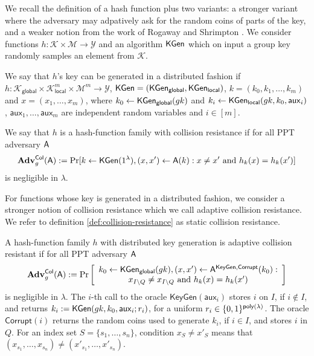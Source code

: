 
We recall the definition of a hash function plus two variants: a stronger variant where  the adversary may adpatively ask for the random coins of parts of the key, and a weaker notion from the work of Rogaway and Shrimpton \cite{FSE:RogShr04}. We consider functions $h:\mathcal{K}\times\mathcal{M}\to\mathcal{Y}$ and an algorithm $\mathsf{KGen}$ which on input a group key randomly samples an element from $\mathcal{K}$.

We say that $h$'s key can be generated in a distributed fashion if $h:\mathcal{K}_\mathsf{global}\times\mathcal{K}^m_{\mathsf{local}}\times\mathcal{M}^m\to \mathcal{Y}$, $\mathsf{KGen} = (\mathsf{KGen}_\mathsf{global},\mathsf{KGen}_\mathsf{local})$, $k = (k_0,k_1,\ldots,k_m)$ and $x=(x_1,\ldots,x_m)$, where $k_0\gets\mathsf{KGen}_{\mathsf{global}}(gk)$ and $k_i\gets\mathsf{KGen}_{\mathsf{local}}(gk,k_0,\mathsf{aux}_i)$, $\mathsf{aux}_1,\ldots,\mathsf{aux}_m$ are independent random variables and $i\in[m]$. 

\begin{definition}\label{def:hash1}
 We say that $h$ is a hash-function family with collision resistance if for all PPT adversary $\mathsf{A}$
$$
\mathbf{Adv}_g^{\mathsf{Col}}(\mathsf{A}) := \Pr[k\gets\mathsf{KGen}(1^\lambda), (x,x')\gets \mathsf{A}(k):x\neq x'\text{ and }h_k(x)=h_k(x')]
$$ 
is negligible in $\lambda$.
\label{def:collision-resistance}
\end{definition}

For functions whose key is generated in a distributed fashion, we consider a stronger notion of collision resistance which we call adaptive collision resistance. We refer to definition \ref{def:collision-resistance} as static collision resistance.


\begin{definition} \label{def:hash1-adaptive}
A hash-function family $h$ with distributed key generation is adaptive collision resistant if for all PPT adversary $\mathsf{A}$
$$
\mathbf{Adv}_g^{\mathsf{Col}}(\mathsf{A}) := \Pr\left[\begin{array}{c}
k_0\gets\mathsf{KGen}_{\mathsf{global}}(gk), (x,x')\gets \mathsf{A}^{\mathsf{KeyGen},\mathsf{Corrupt}}(k_0):\\
x_{I\setminus Q} \neq x_{I\setminus Q}\text{ and }h_k(x)=h_k(x')
\end{array}\right]
$$ 
is negligible in $\lambda$.  The $i$-th call to the oracle $\mathsf{KeyGen}(\mathsf{aux}_i)$ stores $i$ on $I$, if $i\notin I$, and returns $k_i:=\mathsf{KGen}(gk,k_0,\mathsf{aux}_i;r_i)$, for a uniform $r_i\in\{0,1\}^{\mathsf{poly}(\lambda)}$. The oracle $\mathsf{Corrupt}(i)$ returns the random coins used to generate $k_i$, if $i\in I$, and stores $i$ in $Q$. For an index set $S  = \{s_1,\ldots,s_n\}$, condition $x_{S} \neq x'_{S}$ means that $(x_{s_1},\ldots, x_{s_n})\neq (x'_{s_1},\ldots,x'_{s_n})$. 
\end{definition}

